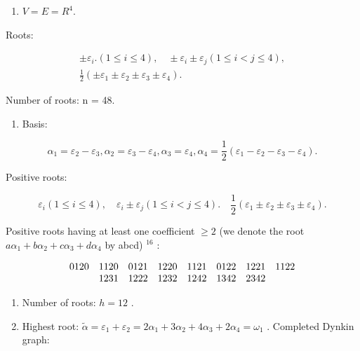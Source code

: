
\begin{enumerate}
\def\labelenumi{(\Roman{enumi})}
\tightlist
\item
  \(V = E = R^4.\)
\end{enumerate}

Roots:

\[
\begin{array}{c} \pm \varepsilon_ {i}. (1 \leqslant i \leqslant 4), \quad \pm \varepsilon_ {i} \pm \varepsilon_ {j} (1 \leqslant i <   j \leqslant 4), \\ \frac {1}{2} (\pm \varepsilon_ {1} \pm \varepsilon_ {2} \pm \varepsilon_ {3} \pm \varepsilon_ {4}). \end{array}
\]

Number of roots: n = 48.

\begin{enumerate}
\def\labelenumi{(\Roman{enumi})}
\setcounter{enumi}{1}
\tightlist
\item
  Basis:
\end{enumerate}

\[
\alpha_ {1} = \varepsilon_ {2} - \varepsilon_ {3}, \alpha_ {2} = \varepsilon_ {3} - \varepsilon_ {4}, \alpha_ {3} = \varepsilon_ {4}, \alpha_ {4} = \frac {1}{2} (\varepsilon_ {1} - \varepsilon_ {2} - \varepsilon_ {3} - \varepsilon_ {4}).
\]

Positive roots:

\[
\varepsilon_ {i} (1 \leqslant i \leqslant 4), \quad \varepsilon_ {i} \pm \varepsilon_ {j} (1 \leqslant i <   j \leqslant 4). \quad \frac {1}{2} (\varepsilon_ {1} \pm \varepsilon_ {2} \pm \varepsilon_ {3} \pm \varepsilon_ {4}).
\]

Positive roots having at least one coefficient \(\geqslant2\) (we denote the root \(a\alpha_{1}+b\alpha_{2}+c\alpha_{3}+d\alpha_{4}\) by abcd) \(^{16}\) :

\[
\begin{array}{c c c c c c c c} 0 1 2 0 & 1 1 2 0 & 0 1 2 1 & 1 2 2 0 & 1 1 2 1 & 0 1 2 2 & 1 2 2 1 & 1 1 2 2 \\ & 1 2 3 1 & 1 2 2 2 & 1 2 3 2 & 1 2 4 2 & 1 3 4 2 & 2 3 4 2 \end{array}
\]

\begin{enumerate}
\def\labelenumi{(\Roman{enumi})}
\setcounter{enumi}{2}
\item
  Number of roots: \(h = 12\) .
\item
  Highest root: \(\tilde{\alpha} = \varepsilon_1 + \varepsilon_2 = 2\alpha_1 + 3\alpha_2 + 4\alpha_3 + 2\alpha_4 = \omega_1\) . Completed Dynkin graph:
\end{enumerate}

